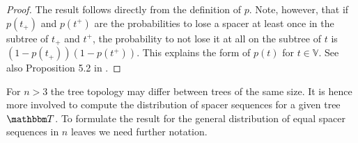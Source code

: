 \documentclass[preprint,authoryear]{elsarticle}
\theoremstyle{definition}
\numberwithin{equation}{section}
\numberwithin{figure}{section}
\begin{document}
\begin{proof}
  The result follows directly from the definition of $p$.
  Note, however, that if $p(t_+)$ and $p(t^+)$
  are the probabilities to lose a spacer at least once in the subtree
  of $t_+$ and $t^+$, the probability to not lose it at all on the
  subtree of $t$ is $(1-p(t_+))(1-p(t^+))$.
  This explains the form of $p(t)$ for $t\in\mathbb V$.
  See also Proposition 5.2 in \cite{BaumdickerHessPfaffelhuber2010}.
\end{proof}

For $n > 3$ the tree topology may differ between trees of the same
size.  It is hence more involved to compute the distribution of spacer
sequences for a given tree $\mathbbm T$.  To formulate the result for
the general distribution of equal spacer sequences in $n$ leaves we
need further notation.
\end{document}
